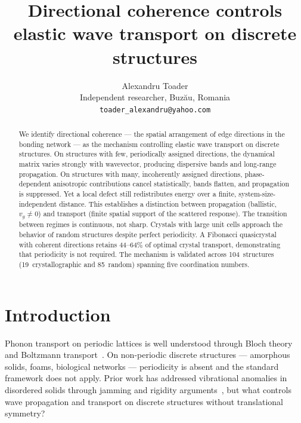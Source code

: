 \documentclass[12pt]{article}
\begin{document}
\title{Directional coherence controls elastic wave transport
on discrete structures}
\author{Alexandru Toader\\
Independent researcher, Buz\u{a}u, Romania\\
\texttt{toader\_alexandru@yahoo.com}}
\date{}

\maketitle

\begin{abstract}
We identify directional coherence --- the spatial arrangement of edge
directions in the bonding network --- as the mechanism controlling elastic
wave transport on discrete structures.  On structures with few, periodically
assigned directions, the dynamical matrix varies strongly with wavevector,
producing dispersive bands and long-range propagation.  On structures with
many, incoherently assigned directions, phase-dependent anisotropic
contributions cancel statistically, bands flatten, and propagation is
suppressed.  Yet a local defect still redistributes energy over a finite,
system-size-independent distance.  This establishes a distinction between
propagation (ballistic, $v_g \neq 0$) and transport (finite spatial support
of the scattered response).  The transition between regimes is continuous,
not sharp.  Crystals with large unit cells approach the behavior of random
structures despite perfect periodicity.  A Fibonacci quasicrystal with
coherent directions retains 44--64\% of optimal crystal transport,
demonstrating that periodicity is not required.  The mechanism is validated
across 104~structures (19~crystallographic and 85~random) spanning five
coordination numbers.
\end{abstract}

\section{Introduction}

Phonon transport on periodic lattices is well understood through Bloch theory
and Boltzmann transport~\cite{ashcroft76,ziman60}.  On non-periodic discrete
structures --- amorphous solids, foams, biological networks --- periodicity is
absent and the standard framework does not apply.  Prior work has addressed
vibrational anomalies in disordered solids through jamming and rigidity
arguments~\cite{wyart05}, but what controls wave propagation and transport on
discrete structures without translational symmetry?
\end{document}
